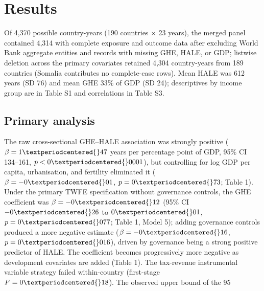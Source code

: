 \documentclass[12pt,a4paper]{article}
\begin{document}

\section*{Results}

Of 4,370 possible country-years (190 countries $\times$ 23 years), the merged panel contained 4,314 with complete exposure and outcome data after excluding World Bank aggregate entities and records with missing GHE, HALE, or GDP; listwise deletion across the primary covariates retained 4,304 country-years from 189 countries (Somalia contributes no complete-case rows). Mean HALE was 61\textperiodcentered{}2 years (SD 7\textperiodcentered{}6) and mean GHE 3\textperiodcentered{}3\% of GDP (SD 2\textperiodcentered{}4); descriptives by income group are in Table S1 and correlations in Table S3.

\subsection*{Primary analysis}

The raw cross-sectional GHE--HALE association was strongly positive ($\beta = 1{\textperiodcentered{}}47$ years per percentage point of GDP, 95\% CI 1{\textperiodcentered{}}34--1{\textperiodcentered{}}61, $p < 0{\textperiodcentered{}}0001$), but controlling for log GDP per capita, urbanisation, and fertility eliminated it ($\beta = -0{\textperiodcentered{}}01$, $p = 0{\textperiodcentered{}}73$; Table 1). Under the primary TWFE specification without governance controls, the GHE coefficient was $\beta = -0{\textperiodcentered{}}12$ (95\% CI $-0{\textperiodcentered{}}26$ to $0{\textperiodcentered{}}01$, $p = 0{\textperiodcentered{}}077$; Table 1, Model 5); adding governance controls produced a more negative estimate ($\beta = -0{\textperiodcentered{}}16$, $p = 0{\textperiodcentered{}}016$), driven by governance being a strong positive predictor of HALE. The coefficient becomes progressively more negative as development covariates are added (Table 1). The tax-revenue instrumental variable strategy failed within-country (first-stage $F = 0{\textperiodcentered{}}18$). The observed upper bound of the 95%
\end{document}
